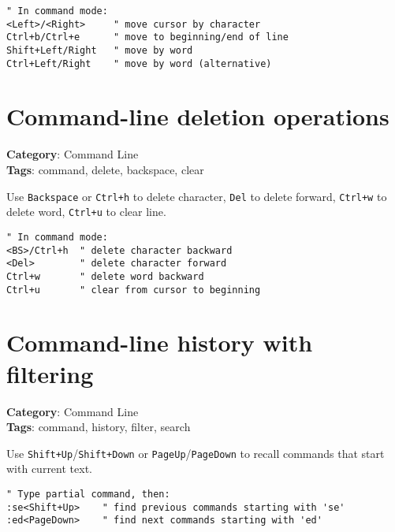{{{\begin{Exa*}{}
\begin{Verbatim}[fontsize=\footnotesize, breaklines, breakanywhere]
" In command mode:
<Left>/<Right>     " move cursor by character
Ctrl+b/Ctrl+e      " move to beginning/end of line
Shift+Left/Right   " move by word
Ctrl+Left/Right    " move by word (alternative)
\end{Verbatim}
\end{Exa*}

\section{Command-line deletion operations}

\textbf{Category}: Command Line\\ \textbf{Tags}: command, delete, backspace, clear
\vspace{0.5cm}

Use {\footnotesize \Verb§Backspace§} or {\footnotesize \Verb§Ctrl+h§} to delete character, {\footnotesize \Verb§Del§} to delete forward, {\footnotesize \Verb§Ctrl+w§} to delete word, {\footnotesize \Verb§Ctrl+u§} to clear line.

\begin{Exa*}{}
\begin{Verbatim}[fontsize=\footnotesize, breaklines, breakanywhere]
" In command mode:
<BS>/Ctrl+h  " delete character backward
<Del>        " delete character forward
Ctrl+w       " delete word backward
Ctrl+u       " clear from cursor to beginning
\end{Verbatim}
\end{Exa*}

\section{Command-line history with filtering}

\textbf{Category}: Command Line\\ \textbf{Tags}: command, history, filter, search
\vspace{0.5cm}

Use {\footnotesize \Verb§Shift+Up§}/{\footnotesize \Verb§Shift+Down§} or {\footnotesize \Verb§PageUp§}/{\footnotesize \Verb§PageDown§} to recall commands that start with current text.

\begin{Exa*}{}
\begin{Verbatim}[fontsize=\footnotesize, breaklines, breakanywhere]
" Type partial command, then:
:se<Shift+Up>    " find previous commands starting with 'se'
:ed<PageDown>    " find next commands starting with 'ed'
\end{Verbatim}
\end{Exa*}

}}}
